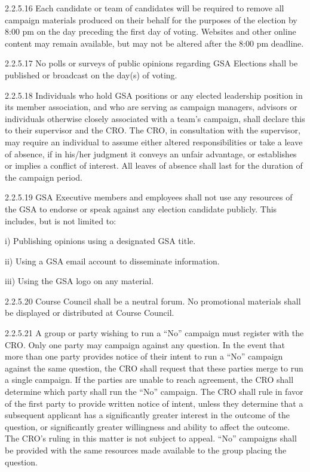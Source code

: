  2.2.5.16 Each candidate or team of candidates will be required to remove 
 all campaign materials produced on their behalf for the purposes 
 of the election by 8:00 pm on the day preceding the first day of 
 voting. Websites and other online content may remain available, 
 but may not be altered after the 8:00 pm deadline. 
 
 2.2.5.17 No polls or surveys of public opinions regarding GSA Elections 
 shall be published or broadcast on the day(s) of voting. 
 
 2.2.5.18 Individuals who hold GSA positions or any elected leadership 
 position in its member association, and who are serving as 
 campaign managers, advisors or individuals otherwise closely 
 associated with a team’s campaign, shall declare this to their 
 supervisor and the CRO. The CRO, in consultation with the 
 supervisor, may require an individual to assume either altered 
 responsibilities or take a leave of absence, if in his/her judgment it conveys an unfair advantage, or establishes or implies a conflict 
 of interest. All leaves of absence shall last for the duration of the 
 campaign period. 
 
 2.2.5.19 GSA Executive members and employees shall not use any 
 resources of the GSA to endorse or speak against any election 
 candidate publicly. This includes, but is not limited to: 
 
 i) Publishing opinions using a designated GSA title. 
 
 ii) Using a GSA email account to disseminate information. 
 
 iii) Using the GSA logo on any material. 
 
 2.2.5.20 Course Council shall be a neutral forum. No promotional 
 materials shall be displayed or distributed at Course Council. 
 
 2.2.5.21 A group or party wishing to run a “No” campaign must register 
 with the CRO. Only one party may campaign against any 
 question. In the event that more than one party provides notice of 
 their intent to run a “No” campaign against the same question, the 
 CRO shall request that these parties merge to run a single 
 campaign. If the parties are unable to reach agreement, the CRO 
 shall determine which party shall run the “No” campaign. The 
 CRO shall rule in favor of the first party to provide written notice 
 of intent, unless they determine that a subsequent applicant has a 
 significantly greater interest in the outcome of the question, or 
 significantly greater willingness and ability to affect the outcome. 
 The CRO’s ruling in this matter is not subject to appeal. “No” 
 campaigns shall be provided with the same resources made 
 available to the group placing the question. 
 
